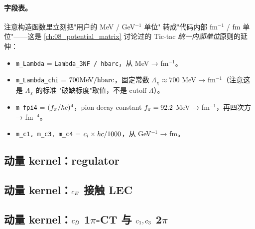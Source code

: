\paragraph{字段表。} 注意构造函数里立刻把"用户的 MeV / GeV\(^{-1}\) 单位"
转成"代码内部 fm\(^{-1}\) / fm 单位"——这是 \cref{ch:08_potential_matrix}
讨论过的 Tic-tac \emph{统一内部单位}原则的延伸：
\begin{itemize}
\item \texttt{m\_Lambda} = \texttt{Lambda\_3NF / hbarc}，从 MeV → fm\(^{-1}\)。
\item \texttt{m\_Lambda\_chi} = \(700 \rm MeV / hbarc\)，固定常数 \(\Lambda_\chi
      \approx 700\) MeV → fm\(^{-1}\)（注意这是 \(\Lambda_\chi\) 的标准
      "破缺标度"取值，不是 cutoff \(\Lambda\)）。
\item \texttt{m\_fpi4} = \((f_\pi/\hbar c)^4\)，pion decay constant \(f_\pi = 92.2\)
      MeV → fm\(^{-1}\)，再四次方 → fm\(^{-4}\)。
\item \texttt{m\_c1, m\_c3, m\_c4} = \(c_i \times \hbar c / 1000\)，从 GeV\(^{-1}\)
      → fm。
\end{itemize}

\subsection{动量 kernel：regulator}
\label{subsec:ch15-kernel-regulator}



\subsection{动量 kernel：\(c_E\) 接触 LEC}
\label{subsec:ch15-kernel-contact}



\subsection{动量 kernel：\(c_D\) 1\(\pi\)-CT 与 \(c_1, c_3\) 2\(\pi\)}
\label{subsec:ch15-kernel-1pe-2pe}

